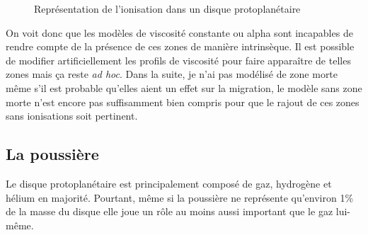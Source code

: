 \begin{figure}[htbp]
\centering
{}\hfill
{}
\caption[Ionisation dans un disque protoplanétaire]{Représentation de l'ionisation dans un disque protoplanétaire}
\end{figure}

On voit donc que les modèles de viscosité constante ou alpha sont incapables de rendre compte de la présence de ces zones de manière intrinsèque. Il est possible de modifier artificiellement les profils de viscosité pour faire apparaître de telles zones mais ça reste \emph{ad hoc}. Dans la suite, je n'ai pas modélisé de zone morte même s'il est probable qu'elles aient un effet sur la migration, le modèle sans zone morte n'est encore pas suffisamment bien compris pour que le rajout de ces zones sans ionisations soit pertinent.

\subsection{La poussière}
Le disque protoplanétaire est principalement composé de gaz, hydrogène et hélium en majorité. Pourtant, même si la poussière ne représente qu'environ 1\% de la masse du disque elle joue un rôle au moins aussi important que le gaz lui-même.

